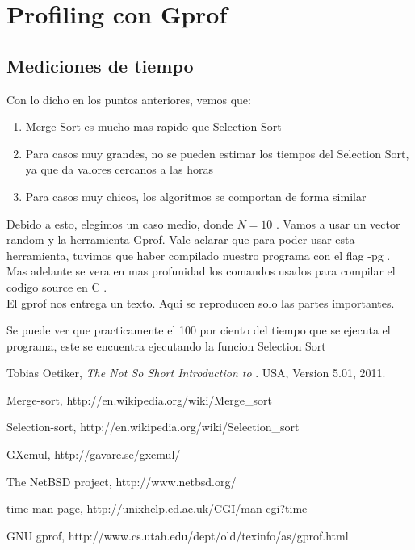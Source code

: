 \newpage

\section{Profiling con Gprof}
\subsection{Mediciones de tiempo}
Con lo dicho en los puntos anteriores, vemos que:
\begin{enumerate} 
 \item {Merge Sort es mucho mas rapido que Selection Sort}
 \item {Para casos muy grandes, no se pueden estimar los tiempos del Selection Sort, ya que da valores cercanos a las horas}
 \item {Para casos muy chicos, los algoritmos se comportan de forma similar}
\end{enumerate}
Debido a esto, elegimos un caso medio, donde $N = 10$ . Vamos a usar un vector random y la herramienta Gprof.
Vale aclarar que para poder usar esta herramienta, tuvimos que haber compilado nuestro programa con el flag -pg .
Mas adelante se vera en mas profunidad los comandos usados para compilar el codigo source en C .
\\ El gprof nos entrega un texto. Aqui se reproducen solo las partes importantes.



Se puede ver que practicamente el 100 por ciento del tiempo que se ejecuta el programa, este se encuentra ejecutando la funcion Selection Sort


\begin{thebibliography}{9}

      Tobias Oetiker,
      \emph{The Not So Short Introduction to \LaTeXe}.
      USA,
      Version 5.01,
      2011.

      Merge-sort, \textrm{http://en.wikipedia.org/wiki/Merge\_sort}

      Selection-sort, \textrm{http://en.wikipedia.org/wiki/Selection\_sort}

      GXemul, \textrm{http://gavare.se/gxemul/}

      The NetBSD project, \textup{http://www.netbsd.org/}

      time man page, \textrm{http://unixhelp.ed.ac.uk/CGI/man-cgi?time}

      GNU gprof, \textrm{http://www.cs.utah.edu/dept/old/texinfo/as/gprof.html} 

\end{thebibliography}

          
